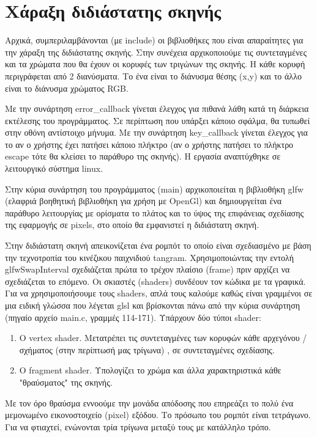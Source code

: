 \documentclass[12pt]{article}
\begin{document}
\section{Χάραξη διδιάστατης σκηνής}
Αρχικά, συμπεριλαμβάνονται (με include) οι βιβλιοθήκες που είναι απαραίτητες για την χάραξη της διδιάστατης σκηνής. Στην συνέχεια αρχικοποιούμε τις συντεταγμένες και τα χρώματα που θα έχουν οι κορυφές των τριγώνων της σκηνής. Η κάθε κορυφή περιγράφεται από 2 διανύσματα. Το ένα είναι το διάνυσμα θέσης (x,y) και το άλλο είναι το διάνυσμα χρώματος \gls{RGB}.

Με την συνάρτηση error\_callback γίνεται έλεγχος για πιθανά λάθη κατά τη διάρκεια εκτέλεσης του προγράμματος. Σε περίπτωση που υπάρξει κάποιο σφάλμα, θα τυπωθεί στην οθόνη αντίστοιχο μήνυμα. Με την συνάρτηση key\_callback γίνεται έλεγχος για το αν ο χρήστης έχει πατήσει κάποιο πλήκτρο (αν ο χρήστης πατήσει το πλήκτρο escape τότε θα κλείσει το παράθυρο της σκηνής). Η εργασία αναπτύχθηκε σε λειτουργικό σύστημα linux.

Στην κύρια συνάρτηση του προγράμματος (main) αρχικοποιείται η βιβλιοθήκη glfw (ελαφριά βοηθητική βιβλιοθήκη για χρήση με OpenGl) και δημιουργείται ένα παράθυρο λειτουργίας με ορίσματα το πλάτος και το ύψος της επιφάνειας σχεδίασης της εφαρμογής σε pixels, στο οποίο θα εμφανιστεί η διδιάστατη σκηνή. 

Στην διδιάστατη σκηνή απεικονίζεται ένα ρομπότ το οποίο είναι σχεδιασμένο με βάση την τεχνοτροπία του κινέζικου παιχνιδιού tangram. Χρησιμοποιώντας την εντολή glfwSwapInterval σχεδιάζεται πρώτα το τρέχον πλαίσιο (frame) πριν αρχίζει να σχεδιάζεται το επόμενο. Οι σκιαστές (shaders) συνδέουν τον κώδικα με τα γραφικά. Για να χρησιμοποιήσουμε τους shaders, απλά τους καλούμε καθώς είναι γραμμένοι σε μια ειδική γλώσσα που λέγεται \gls{glsl} και βρίσκονται πάνω από την κύρια συνάρτηση (πηγαίο αρχείο main.c, γραμμές 114-171). Υπάρχουν δύο τύποι shader: 

\begin{enumerate}
  \item O vertex shader. Μετατρέπει τις συντεταγμένες των κορυφών κάθε αρχεγόνου / σχήματος (στην περίπτωσή μας τρίγωνα) , σε συντεταγμένες σχεδίασης.
  \item O fragment shader. Υπολογίζει το χρώμα και άλλα χαρακτηριστικά κάθε "θραύσματος" της σκηνής.
\end{enumerate}

 Με τον όρο θραύσμα εννοούμε την μονάδα απόδοσης που επηρεάζει το πολύ ένα μεμονωμένο εικονοστοιχείο (pixel) εξόδου. Το πρόσωπο του ρομπότ είναι τετράγωνο. Για να φτιαχτεί, ενώνονται τρία τρίγωνα μεταξύ τους με κατάλληλο τρόπο.
 
\end{document}
